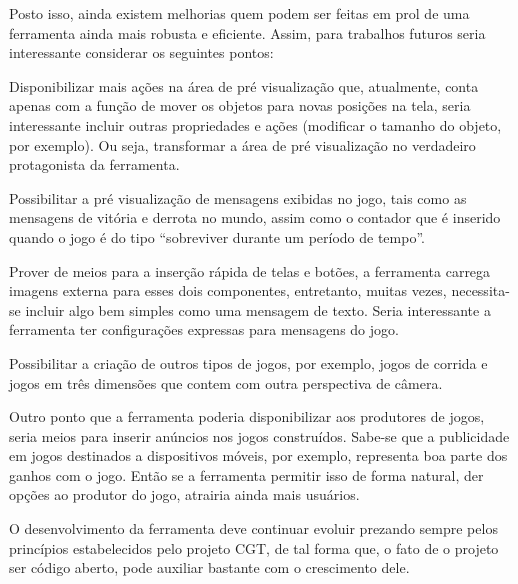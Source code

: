 \documentclass[12pt,oneside,openright,a4paper,english,brazil,sumario=tradicional]{abntex2}
\begin{document}
Posto isso, ainda existem melhorias quem podem ser feitas em prol de uma ferramenta ainda mais robusta e eficiente. Assim, para trabalhos futuros seria interessante considerar os seguintes pontos:
\begin{alineas}
\item Disponibilizar mais ações na área de pré visualização que, atualmente, conta apenas com a função de mover os objetos para novas posições na tela, seria interessante incluir outras propriedades e ações (modificar o tamanho do objeto, por exemplo). Ou seja, transformar a área de pré visualização no verdadeiro protagonista da ferramenta.
\item Possibilitar a pré visualização de mensagens exibidas no jogo, tais como as mensagens de vitória e derrota no mundo, assim como o contador que é inserido quando o jogo é do tipo ``sobreviver durante um período de tempo''.
\item Prover de meios para a inserção rápida de telas e botões, a ferramenta carrega imagens externa para esses dois componentes, entretanto, muitas vezes, necessita-se incluir algo bem simples como uma mensagem de texto. Seria interessante a ferramenta ter configurações expressas para mensagens do jogo.
\item Possibilitar a criação de outros tipos de jogos, por exemplo, jogos de corrida e jogos em três dimensões que contem com outra perspectiva de câmera.
\item Outro ponto que a ferramenta poderia disponibilizar aos produtores de jogos, seria meios para inserir anúncios nos jogos construídos. Sabe-se que a publicidade em jogos destinados a dispositivos móveis, por exemplo, representa boa parte dos ganhos com o jogo. Então se a ferramenta permitir isso de forma natural, der opções ao produtor do jogo, atrairia ainda mais usuários.
\end{alineas}

O desenvolvimento da ferramenta deve continuar evoluir prezando sempre pelos princípios estabelecidos pelo projeto CGT, de tal forma que, o fato de o projeto ser código aberto, pode auxiliar bastante com o crescimento dele.



\postextual

\end{document}
